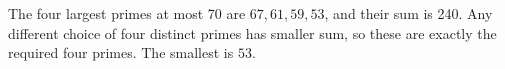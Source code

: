 The four largest primes at most 70 are $67,61,59,53$, and their sum is 240. Any different choice of four distinct primes has smaller sum, so these are exactly the required four primes. The smallest is $\boxed{53}$.
